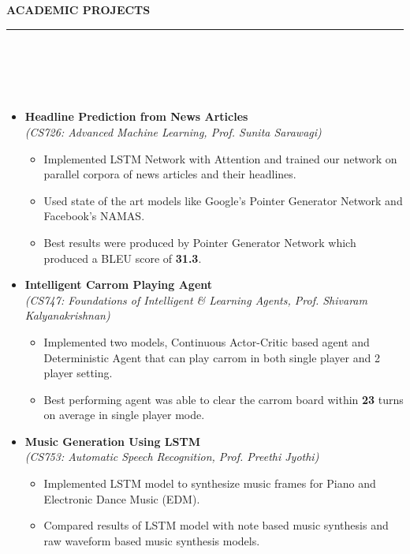 \documentclass[a4paper,10pt]{article}
\newcommand{\isep}{-2 pt}
\newcommand{\lsep}{-0.5cm}
\newcommand{\resheading}[1]{{\small
        {
            \begin{minipage}
                {0.975\textwidth}\textbf{{\textsc{#1 \vphantom{p\^{E}} }}}
                \\[-0.3cm]
                \hrule
            \end{minipage}
            \\[-0.5cm]
        }
 }}
\begin{document}
\pagebreak
\resheading{\textbf{\large ACADEMIC PROJECTS}}\\[\lsep]
\\[-0.4cm]
\begin{itemize}

\item \textbf{ Headline Prediction from News Articles} \\ \emph{(CS726: Advanced Machine Learning, Prof. Sunita Sarawagi)}
    \\ [-0.6cm]
    \begin{itemize}\itemsep \isep
    \item Implemented LSTM Network with Attention and trained our network on parallel corpora of news articles and their headlines.
    \item Used state of the art models like Google\mbox{'}s Pointer Generator Network and Facebook\mbox{'}s NAMAS.
    \item Best results were produced by Pointer Generator Network which produced a BLEU score of \textbf{31.3}.
    \end{itemize}

\item \textbf{Intelligent Carrom Playing Agent}
\\ {\emph{(CS747: Foundations of Intelligent \& Learning Agents, Prof. Shivaram Kalyanakrishnan)}}
    \\ [-0.6cm]
    \begin{itemize}\itemsep \isep
    \item Implemented two models, Continuous Actor-Critic based agent and Deterministic Agent that can play carrom in both single player and 2 player setting.
    \item Best performing agent was able to clear the carrom board within \textbf{23} turns on average in single player mode.

    \end{itemize}


\item \textbf{Music Generation Using LSTM}
\\ {\emph{(CS753: Automatic Speech Recognition, Prof. Preethi Jyothi)}}
    \\ [-0.6cm]
    \begin{itemize}\itemsep \isep
    \item Implemented LSTM model to synthesize music frames for Piano and Electronic Dance Music (EDM).
    \item Compared results of LSTM model with note based music synthesis and raw waveform based music synthesis models.
    \end{itemize}



\end{itemize}
\end{document}
